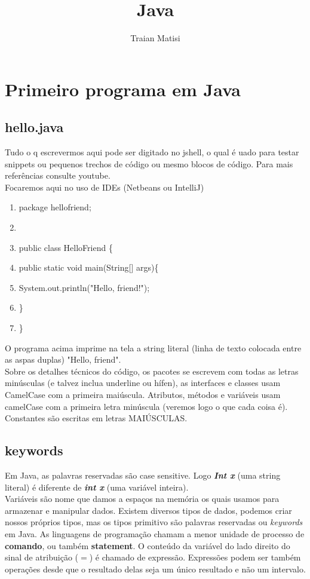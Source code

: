 \documentclass[12pt,a4paper]{article} %
\author{Traian Matisi}
\title{Java}
\begin{document}
\maketitle

\section{Primeiro programa em Java}
\subsection{hello.java}
Tudo o q escrevermos aqui pode ser digitado no jshell, o qual é uado para testar snippets ou pequenos trechos de código ou mesmo blocos de código. Para mais referências consulte youtube.\\
Focaremos aqui no uso de IDEs (Netbeans ou IntelliJ)
\begin{enumerate}
\item package hellofriend;
\item 
\item public class HelloFriend \{
\item \tabto{1.1cm}public static void main(String[] args)\{
\item \tabto{2.2cm}System.out.println("Hello, friend!");
\item \tabto{1.1cm}\}
\item \}
\end{enumerate}
O programa acima imprime na tela a string literal (linha de texto colocada entre as aspas duplas) "Hello, friend".\\
Sobre os detalhes técnicos do código, os pacotes se escrevem com todas as letras minúsculas (e talvez inclua underline ou hífen), as interfaces e classes usam CamelCase com a primeira maiúscula. Atributos, métodos e variáveis usam camelCase com a primeira letra minúscula (veremos logo o que cada coisa é). Constantes são escritas em letras MAIÚSCULAS.

\subsection{keywords}
Em Java, as palavras reservadas são case sensitive. Logo \textit{\textbf{Int x}} (uma string literal) é diferente de \textit{\textbf{int x}} (uma variável inteira).\\
Variáveis são nome que damos a espaços na memória os quais usamos para armazenar e manipular dados. Existem diversos tipos de dados, podemos criar nossos próprios tipos, mas os tipos primitivo são palavras reservadas ou \textit{keywords} em Java. As linguagens de programação chamam a menor unidade de processo de \textbf{comando}, ou também \textbf{statement}. O conteúdo da variável do lado direito do sinal de atribuição ($=$) é chamado de expressão. Expressões podem ser também operações desde que o resultado delas seja um único resultado e não um intervalo.\\
\end{document}
